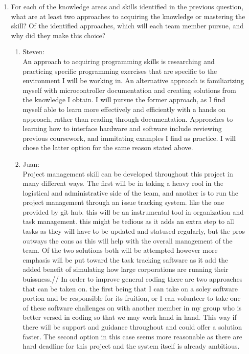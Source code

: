 \documentclass[12pt]{article}
\begin{document}
\begin{enumerate}
\begin{enumerate}
  \end{enumerate}
  \item For each of the knowledge areas and skills identified in the previous
  question, what are at least two approaches to acquiring the knowledge or
  mastering the skill?  Of the identified approaches, which will each team
  member pursue, and why did they make this choice?
  \begin{enumerate}
    \item{Steven:}\\
    An approach to acquiring programming skills is researching and practicing specific
    programming exercises that are specific to the environment I will be working in.
    An alternative approach is familiarizing myself with microcontroller documentation and
    creating solutions from the knowledge I obtain. I will pursue the former approach, as 
    I find myself able to learn more effectively and efficiently with a hands on approach, 
    rather than reading through documentation. Approaches to learning how to interface 
    hardware and software include reviewing previous coursework, and immitating examples
    I find as practice. I will chose the latter option for the same reason stated above.\\
    \item{Juan:}\\
        Project management skill can be developed throughout this project in many different ways. The first will be in taking a heavy rool in the logistical and administrative side of the team, and another is to run the project management through an issue tracking system.
        like the one provided by git hub. this will be an instrumental tool in organization and task management. this might be tedious as it adds an extra step to all tasks as they will have to be updated and statused regularly, but the pros outways the cons 
        as this will help with the overall management of the team. Of the two solutions both will be attempted however more emphasis will be put toward the task tracking saftware as it add the added benefit of simulating how large corporations are running their buissness.//
        In order to improve general coding there are two approaches that can be taken on. the first being that I can take on a soley software portion and be responsible for its fruition, or I can volunteer to take one of these software challenges on with another member in 
        my group who is better versed in coding so that we may work hand in hand. This way if there will be support and guidance throughout and could offer a solution faster. The second option in this case seems more reasonable as there are hard deadline for this project and the system itself is already ambitious.

\end{enumerate}
\end{enumerate}
\end{document}

